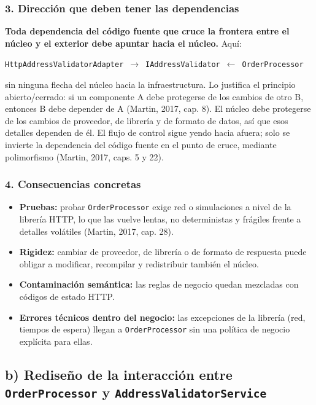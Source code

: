 \documentclass[11pt,a4paper]{article}
\begin{document}
\subsubsection*{3. Dirección que deben tener las dependencias}

\textbf{Toda dependencia del código fuente que cruce la frontera entre el núcleo y el exterior
debe apuntar hacia el núcleo.} Aquí:
\begin{center}
\texttt{HttpAddressValidatorAdapter}~$\rightarrow$~\texttt{IAddressValidator}~$\leftarrow$~\texttt{OrderProcessor}
\end{center}
\noindent sin ninguna flecha del núcleo hacia la infraestructura. Lo justifica el principio
abierto/cerrado: si un componente A debe protegerse de los cambios de otro B, entonces B debe
depender de A (Martin, 2017, cap. 8). El núcleo debe protegerse de los cambios de proveedor,
de librería y de formato de datos, así que esos detalles dependen de él. El flujo de control
sigue yendo hacia afuera; solo se invierte la dependencia del código fuente en el punto de
cruce, mediante polimorfismo (Martin, 2017, caps. 5 y 22).

\subsubsection*{4. Consecuencias concretas}

\begin{itemize}[leftmargin=1.4em]
\item \textbf{Pruebas:} probar \texttt{OrderProcessor} exige red o simulaciones a nivel de la
librería HTTP, lo que las vuelve lentas, no deterministas y frágiles frente a detalles
volátiles (Martin, 2017, cap. 28).
\item \textbf{Rigidez:} cambiar de proveedor, de librería o de formato de respuesta puede
obligar a modificar, recompilar y redistribuir también el núcleo.
\item \textbf{Contaminación semántica:} las reglas de negocio quedan mezcladas con códigos de
estado HTTP.
\item \textbf{Errores técnicos dentro del negocio:} las excepciones de la librería (red,
tiempos de espera) llegan a \texttt{OrderProcessor} sin una política de negocio explícita
para ellas.
\end{itemize}

\subsection*{b) Rediseño de la interacción entre \texttt{OrderProcessor} y \texttt{AddressValidatorService}}
\end{document}
